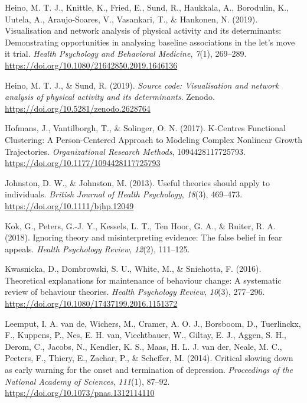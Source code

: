 \documentclass[
  british,
  man,floatsintext]{apa6}
\begin{document}
\leavevmode\hypertarget{ref-heinoVisualisationNetworkAnalysis2019a}{}%
Heino, M. T. J., Knittle, K., Fried, E., Sund, R., Haukkala, A., Borodulin, K., Uutela, A., Araujo-Soares, V., Vasankari, T., \& Hankonen, N. (2019). Visualisation and network analysis of physical activity and its determinants: Demonstrating opportunities in analysing baseline associations in the let's move it trial. \emph{Health Psychology and Behavioral Medicine}, \emph{7}(1), 269--289. \url{https://doi.org/10.1080/21642850.2019.1646136}

\leavevmode\hypertarget{ref-heinoSourceCodeVisualisation2019}{}%
Heino, M. T. J., \& Sund, R. (2019). \emph{Source code: Visualisation and network analysis of physical activity and its determinants}. Zenodo. \url{https://doi.org/10.5281/zenodo.2628764}

\leavevmode\hypertarget{ref-hofmansKCentresFunctionalClustering2017}{}%
Hofmans, J., Vantilborgh, T., \& Solinger, O. N. (2017). K-Centres Functional Clustering: A Person-Centered Approach to Modeling Complex Nonlinear Growth Trajectories. \emph{Organizational Research Methods}, 1094428117725793. \url{https://doi.org/10.1177/1094428117725793}

\leavevmode\hypertarget{ref-johnstonUsefulTheoriesShould2013}{}%
Johnston, D. W., \& Johnston, M. (2013). Useful theories should apply to individuals. \emph{British Journal of Health Psychology}, \emph{18}(3), 469--473. \url{https://doi.org/10.1111/bjhp.12049}

\leavevmode\hypertarget{ref-kokIgnoringTheoryMisinterpreting2018}{}%
Kok, G., Peters, G.-J. Y., Kessels, L. T., Ten Hoor, G. A., \& Ruiter, R. A. (2018). Ignoring theory and misinterpreting evidence: The false belief in fear appeals. \emph{Health Psychology Review}, \emph{12}(2), 111--125.

\leavevmode\hypertarget{ref-kwasnickaTheoreticalExplanationsMaintenance2016}{}%
Kwasnicka, D., Dombrowski, S. U., White, M., \& Sniehotta, F. (2016). Theoretical explanations for maintenance of behaviour change: A systematic review of behaviour theories. \emph{Health Psychology Review}, \emph{10}(3), 277--296. \url{https://doi.org/10.1080/17437199.2016.1151372}

\leavevmode\hypertarget{ref-leemputCriticalSlowingEarly2014}{}%
Leemput, I. A. van de, Wichers, M., Cramer, A. O. J., Borsboom, D., Tuerlinckx, F., Kuppens, P., Nes, E. H. van, Viechtbauer, W., Giltay, E. J., Aggen, S. H., Derom, C., Jacobs, N., Kendler, K. S., Maas, H. L. J. van der, Neale, M. C., Peeters, F., Thiery, E., Zachar, P., \& Scheffer, M. (2014). Critical slowing down as early warning for the onset and termination of depression. \emph{Proceedings of the National Academy of Sciences}, \emph{111}(1), 87--92. \url{https://doi.org/10.1073/pnas.1312114110}
\end{document}
